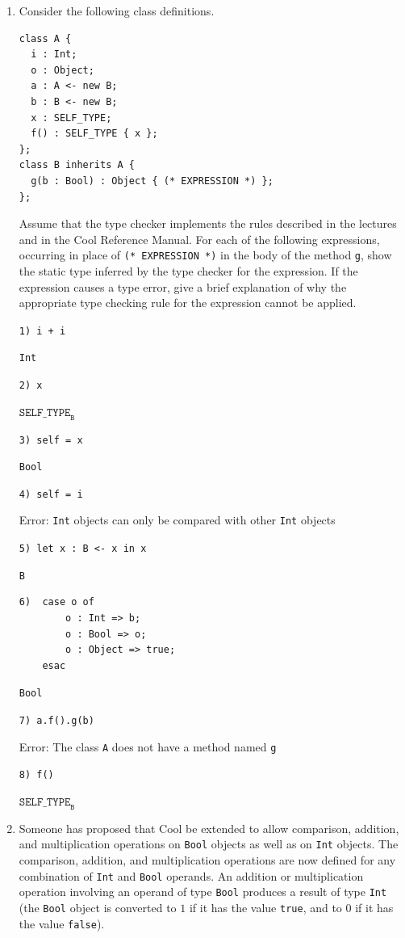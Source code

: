 \documentclass[11pt]{article}
\begin{document}

\begin{enumerate}

\item Consider the following class definitions.
\begin{verbatim}
class A {
  i : Int;
  o : Object;
  a : A <- new B;
  b : B <- new B;
  x : SELF_TYPE;
  f() : SELF_TYPE { x };
};
class B inherits A {
  g(b : Bool) : Object { (* EXPRESSION *) };
};
\end{verbatim}

Assume that the type checker implements the rules described in the
lectures and in the Cool Reference Manual.  For each of the following
expressions, occurring in place of \texttt{(* EXPRESSION *)} in the
body of the method \texttt{g}, show the static type inferred by the
type checker for the expression.  If the expression causes a type
error, give a brief explanation of why the appropriate type checking
rule for the expression cannot be applied.

\texttt{1)  i + i}

\texttt{Int}

\texttt{2)  x}

$\mathtt{SELF\_TYPE}_{\mathtt{B}}$

\texttt{3)  self = x}

\texttt{Bool}

\texttt{4)  self = i}

Error: \texttt{Int} objects can only be compared with other
\texttt{Int} objects

\texttt{5)  let x : B <- x in x}

\texttt{B}

\begin{verbatim}
6)  case o of
        o : Int => b;
        o : Bool => o;
        o : Object => true;
    esac
\end{verbatim}
\texttt{Bool}

\texttt{7)  a.f().g(b)}

Error: The class \texttt{A} does not have a method named \texttt{g}

\texttt{8)  f()}

$\mathtt{SELF\_TYPE}_{\mathtt{B}}$

\item Someone has proposed that Cool be extended to allow comparison,
addition, and multiplication operations on \texttt{Bool} objects as
well as on \texttt{Int} objects.  The comparison, addition, and
multiplication operations are now defined for any combination of
\texttt{Int} and \texttt{Bool} operands.  An addition or
multiplication operation involving an operand of type \texttt{Bool}
produces a result of type \texttt{Int} (the \texttt{Bool} object is
converted to $1$ if it has the value \texttt{true}, and to $0$ if it
has the value \texttt{false}).


\end{enumerate}
\end{document}
